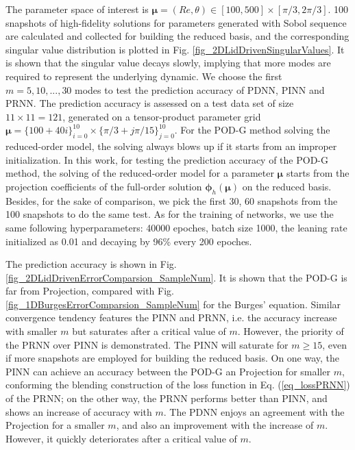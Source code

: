 \documentclass[preprint, 10pt]{elsarticle}
\begin{document}
The parameter space of interest is $\pmb{\mu}=(Re, \theta) \in [100,500] \times [\pi/3, 2\pi/3]$. 100 snapshots of high-fidelity solutions for parameters generated with Sobol sequence are calculated and collected for building the reduced basis, and the corresponding singular value distribution is plotted in Fig. \ref{fig_2DLidDrivenSingularValues}. It is shown that the singular value decays slowly, implying that more modes are required to represent the underlying dynamic. We choose the first $m=5, 10,...,30$ modes to test the prediction accuracy of PDNN, PINN and PRNN.
The prediction accuracy is assessed on a test data set of size $11 \times 11=121$, generated on a tensor-product parameter grid $\pmb{\mu}=\{100+ 40i\}_{i=0}^{10} \times \{\pi/3+ j\pi/15\}_{j=0}^{10}$.
For the POD-G method solving the reduced-order model, the solving always blows up if it starts from an improper initialization. In this work, for testing the prediction accuracy of the POD-G method, the solving of the reduced-order model for a parameter $\pmb{\mu}$ starts from the projection coefficients of the full-order solution $\pmb{\phi}_h \left( \pmb{\mu} \right)$ on the reduced basis.
Besides, for the sake of comparison, we pick the first 30, 60 snapshots from the 100 snapshots to do the same test. As for the training of networks, we use the same following hyperparameters: 40000 epoches, batch size 1000, the leaning rate initialized as 0.01 and decaying by 96\% every 200 epoches.

The prediction accuracy is shown in Fig. \ref{fig_2DLidDrivenErrorComparsion_SampleNum}. It is shown that the POD-G is far from Projection, compared with Fig. \ref{fig_1DBurgesErrorComparsion_SampleNum} for the Burges' equation. Similar convergence tendency features the PINN and PRNN, i.e. the accuracy increase with  smaller $m$ but saturates after a critical value of $m$. However, the priority of the PRNN over PINN is demonstrated. The PINN will saturate for $m \ge 15$, even if more snapshots are employed for building the reduced basis.
On one way, the PINN can achieve an accuracy between the POD-G an Projection for smaller $m$, conforming the blending construction of the loss function in Eq. (\ref{eq_lossPRNN}) of the PRNN; on the other way, the PRNN performs better than PINN, and shows an increase of accuracy with $m$. The PDNN enjoys an agreement with the Projection for a smaller $m$, and also an improvement with the increase of $m$. However, it quickly deteriorates after a critical value of $m$.
\end{document}
